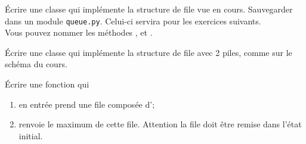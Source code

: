 \documentclass[a4paper,12pt,french]{article}
\begin{document}

\begin{exercice}
	\'Ecrire une classe  qui implémente la structure de file vue en cours. Sauvegarder dans un module \texttt{queue.py}. Celui-ci servira pour les exercices suivants.\\
    
    Vous pouvez nommer les méthodes ,  et .
\end{exercice}

\begin{exercice}
\'Ecrire une classe  qui implémente la structure de file avec 2 piles, comme sur le schéma du cours.
\end{exercice}

\begin{exercice}
    
\'Ecrire une fonction  qui
\begin{enumerate}[--]
    \item 	en entrée prend une file composée d';
    \item 	renvoie le maximum de cette file. Attention la file doit être remise dans l'état initial.
\end{enumerate}
\end{exercice}
\end{document}

